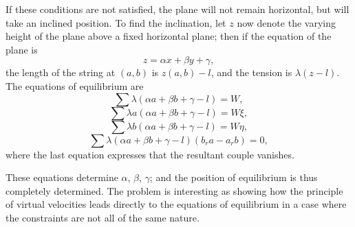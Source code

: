 \documentclass[11pt,a4paper]{article}
\theoremstyle{plain}
\begin{document}
If these conditions are not satisfied, the plane will not remain horizontal, but will take an inclined position. To find the inclination, let $z$ now denote the varying height of the plane above a fixed horizontal plane; then if the equation of the plane is
\[
z = \alpha x + \beta y + \gamma,
\]
the length of the string at $(a,b)$ is $z(a,b)-l$, and the tension is $\lambda(z-l)$. The equations of equilibrium are
\[
\sum \lambda(\alpha a + \beta b + \gamma - l) = W,
\]
\[
\sum \lambda a(\alpha a + \beta b + \gamma - l) = W\xi,
\]
\[
\sum \lambda b(\alpha a + \beta b + \gamma - l) = W\eta,
\]
\[
\sum \lambda(\alpha a + \beta b + \gamma - l)(b_r a - a_r b) = 0,
\]
where the last equation expresses that the resultant couple vanishes.

These equations determine $\alpha$, $\beta$, $\gamma$; and the position of equilibrium is thus completely determined. The problem is interesting as showing how the principle of virtual velocities leads directly to the equations of equilibrium in a case where the constraints are not all of the same nature.
\end{document}
